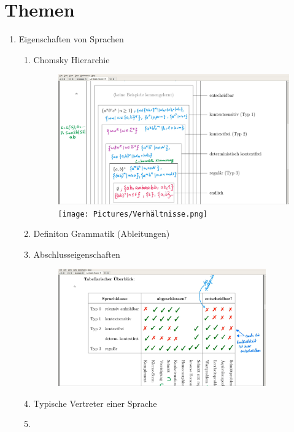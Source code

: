\documentclass[12pt]{scrartcl}
\begin{document}
\section{Themen}
	\begin{enumerate}
	
	\item Eigenschaften von Sprachen
		\begin{enumerate}
			\item Chomsky Hierarchie 
				\begin{figure}[!h]
				\centering
				\includegraphics[width=1\textwidth]{Pictures/Chomsky.png}
				\texttt{[image: Pictures/Verhältnisse.png]}
				\end{figure}
			\item Definiton Grammatik (Ableitungen) 
			\item Abschlusseigenschaften
				\begin{figure}[!h]
				\centering
				\includegraphics[width=0.9\textwidth]{Pictures/Abschlusseigenschaften.png}
				\end{figure}
			\item Typische Vertreter einer Sprache
			\item 
		\end{enumerate}
		

\end{enumerate}
\end{document}
